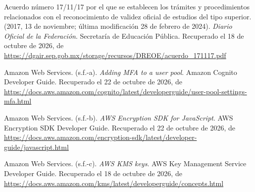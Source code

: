 \documentclass[12pt, a4paper]{article}
\begin{document}
\begin{list}{}{\setlength{\leftmargin}{1.27cm}\setlength{\itemindent}{-1.27cm}%
  \setlength{\labelwidth}{0pt}\setlength{\labelsep}{0pt}\setlength{\itemsep}{6pt}}\raggedright
 
\item Acuerdo número 17/11/17 por el que se establecen los trámites y
  procedimientos relacionados con el reconocimiento de validez oficial
  de estudios del tipo superior. (2017, 13 de noviembre; última
  modificación 28 de febrero de 2024). \textit{Diario Oficial de la
  Federación}. Secretaría de Educación Pública.
Recuperado el 18 de octubre de 2026, de \url{https://dgair.sep.gob.mx/storage/recursos/DREOE/acuerdo_171117.pdf}
 

\item Amazon Web Services. (s.f.-a). \textit{Adding MFA to a user pool}.
  Amazon Cognito Developer Guide. Recuperado el 22 de octubre de 2026, de \url{https://docs.aws.amazon.com/cognito/latest/developerguide/user-pool-settings-mfa.html}
 
 
\item Amazon Web Services. (s.f.-b). \textit{AWS Encryption SDK for
  JavaScript}. AWS Encryption SDK Developer Guide. Recuperado el 22 de octubre de 2026, de \url{https://docs.aws.amazon.com/encryption-sdk/latest/developer-guide/javascript.html}
 
 
\item Amazon Web Services. (s.f.-c). \textit{AWS KMS keys}. AWS Key
  Management Service Developer Guide. Recuperado el 18 de octubre de 2026, de \url{https://docs.aws.amazon.com/kms/latest/developerguide/concepts.html}
 

\end{list}
\end{document}
